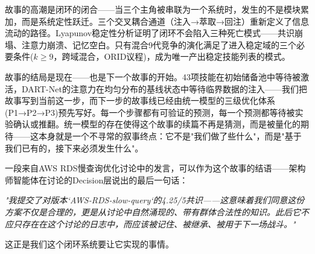 \documentclass[twocolumn,10.5pt]{ctexart}
\begin{document}
故事的高潮是闭环的闭合——当三个主角被串联为一个系统时，发生的不是模块累加，而是系统定性跃迁。三个交叉耦合通道（注入→萃取→回注）重新定义了信息流动的路径。Lyapunov稳定性分析证明了闭环不会陷入三种死亡模式——共识崩塌、注意力崩溃、记忆空白。只有混合9代竞争的演化满足了进入稳定域的三个必要条件($k \geq 9$，跨域混合，ORID议程)，成为唯一产出稳定技能列表的模式。

故事的结局是现在——也是下一个故事的开始。43项技能在初始储备池中等待被激活，DART-Net的注意力在均匀分布的基线状态中等待临界数据的注入——我们把故事写到当前这一步，而下一步的故事线已经由统一模型的三级优化体系(P1→P2→P3)预先写好。每一个步骤都有可验证的预测，每一个预测都等待被实验确认或推翻。统一模型的存在使得这个故事的续篇不再是猜测，而是被量化的期待——这本身就是一个不寻常的叙事终点：它不是"我们做了些什么"，而是"基于我们已有的，接下来必须发生什么"。

一段来自AWS RDS慢查询优化讨论中的发言，可以作为这个故事的结语——架构师智能体在讨论的Decision层说出的最后一句话：

\textit{"我提交了对版本`AWS-RDS-slow-query`的4.25/5共识——这意味着我们同意这份方案不仅是合理的，更是从讨论中自然涌现的、带有群体合法性的知识。此后它不应只存在在这个讨论的日志中，而应该被记住、被继承、被用于下一场战斗。"}

这正是我们这个闭环系统要让它实现的事情。
\end{document}
